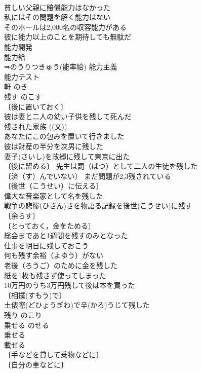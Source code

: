 \documentclass[8pt]{extreport}
\begin{document}
\begin{CJK}{UTF8}{min}
\\	貧しい父親に賠償能力はなかった 
\\	私にはその問題を解く能力はない 
\\	そのホールは2,000名の収容能力がある 
\\	彼に能力以上のことを期待しても無駄だ 
\\	能力開発 
\\	能力給 
\\	⇒のうりつきゅう(能率給) 能力主義 
\\	能力テスト 
\\	軒	のき	
\\	残す	のこす	
\\	〔後に置いておく〕
\\	彼は妻と二人の幼い子供を残して死んだ 
\\	残された家族 ((文)) 
\\	あなたにこの包みを置いて行きました 
\\	彼は財産の半分を次男に残した 
\\	妻子(さいし)を故郷に残して東京に出た 
\\	〔後に留める〕 先生は罰（ばつ）として二人の生徒を残した 
\\	〔済（す）んでいない〕 まだ問題が2,3残されている 
\\	〔後世（こうせい）に伝える〕
\\	偉大な音楽家として名を残した 
\\	戦争の悲惨(ひさん)さを物語る記録を後世(こうせい)に残す 
\\	〔余らす〕
\\	〔とっておく，金をためる〕
\\	総会まであと1週間を残すのみとなった 
\\	仕事を明日に残しておこう 
\\	何も残す余裕（よゆう）がない 
\\	老後（ろうご）のために金を残した 
\\	紙を1枚も残さず使ってしまった 
\\	10万円のうち3万円残して後は本を買った 
\\	〔相撲(すもう)で〕
\\	土俵際(どひょうぎわ)で辛(かろ)うじて残した 
\\	残り	のこり	
\\	乗せる	のせる	
\\	乗せる 
\\	載せる 
\\	〔手などを貸して乗物などに〕
\\	〔自分の車などに〕

\end{CJK}
\end{document}
